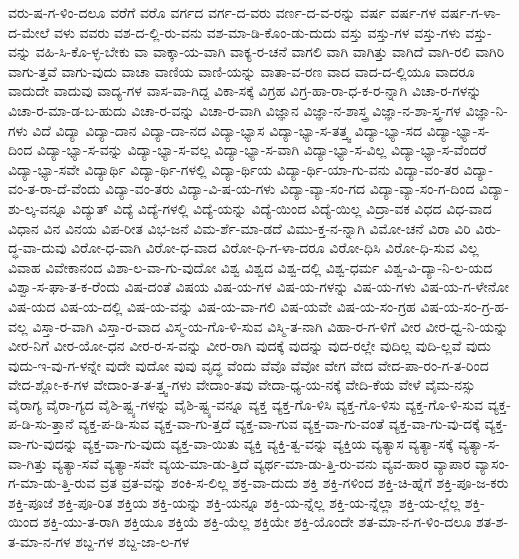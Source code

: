 {ವರು-ಷ-ಗ-ಳಿಂ-ದಲೂ
ವರೆಗೆ
ವರೊ
ವರ್ಗದ
ವರ್ಗ-ದ-ವರು
ವರ್ಣ-ದ-ವ-ರನ್ನು
ವರ್ಷ
ವರ್ಷ-ಗಳ
ವರ್ಷ-ಗ-ಳಾ-ದ-ಮೇಲೆ
ವಳು
ವವರು
ವಶ-ದ-ಲ್ಲಿ-ರು-ವನು
ವಶ-ಮಾ-ಡಿ-ಕೊಂ-ಡು-ದುದು
ವಸ್ತು
ವಸ್ತು-ಗಳ
ವಸ್ತು-ಗಳು
ವಸ್ತು-ವನ್ನು
ವಹಿ-ಸಿ-ಕೊ-ಳ್ಳ-ಬೇಕು
ವಾ
ವಾಕ್ಕಾ-ಯ-ವಾಗಿ
ವಾಕ್ಯ-ರ-ಚನೆ
ವಾಗಲಿ
ವಾಗಿ
ವಾಗಿತ್ತು
ವಾಗಿದೆ
ವಾಗಿ-ರಲಿ
ವಾಗಿರಿ
ವಾಗು-ತ್ತವೆ
ವಾಗು-ವುದು
ವಾಚಾ
ವಾಣಿಯ
ವಾಣಿ-ಯನ್ನು
ವಾತಾ-ವ-ರಣ
ವಾದ
ವಾದ-ದ-ಲ್ಲಿಯೂ
ವಾದರೂ
ವಾದುದೇ
ವಾದುವು
ವಾದ್ಯ-ಗಳ
ವಾಸ-ವಾ-ಗಿದ್ದ
ವಿಕಾ-ಸಕ್ಕೆ
ವಿಗ್ರಹ
ವಿಗ್ರ-ಹಾ-ರಾ-ಧ-ಕ-ರ-ನ್ನಾಗಿ
ವಿಚಾ-ರ-ಗಳನ್ನು
ವಿಚಾ-ರ-ಮಾ-ಡ-ಬ-ಹುದು
ವಿಚಾ-ರ-ವನ್ನು
ವಿಚಾ-ರ-ವಾಗಿ
ವಿಜ್ಞಾನ
ವಿಜ್ಞಾ-ನ-ಶಾಸ್ತ್ರ
ವಿಜ್ಞಾ-ನ-ಶಾ-ಸ್ತ್ರ-ಗಳ
ವಿಜ್ಞಾ-ನಿ-ಗಳು
ವಿದೆ
ವಿದ್ಯಾ
ವಿದ್ಯಾ-ದಾನ
ವಿದ್ಯಾ-ದಾ-ನದ
ವಿದ್ಯಾ-ಭ್ಯಾಸ
ವಿದ್ಯಾ-ಭ್ಯಾ-ಸ-ತತ್ತ್ವ
ವಿದ್ಯಾ-ಭ್ಯಾ-ಸದ
ವಿದ್ಯಾ-ಭ್ಯಾ-ಸ-ದಿಂದ
ವಿದ್ಯಾ-ಭ್ಯಾ-ಸ-ವನ್ನು
ವಿದ್ಯಾ-ಭ್ಯಾ-ಸ-ವಲ್ಲ
ವಿದ್ಯಾ-ಭ್ಯಾ-ಸ-ವಾಗಿ
ವಿದ್ಯಾ-ಭ್ಯಾ-ಸ-ವಿಲ್ಲ
ವಿದ್ಯಾ-ಭ್ಯಾ-ಸ-ವೆಂದರೆ
ವಿದ್ಯಾ-ಭ್ಯಾ-ಸವೇ
ವಿದ್ಯಾರ್ಥಿ
ವಿದ್ಯಾ-ರ್ಥಿ-ಗಳಲ್ಲಿ
ವಿದ್ಯಾ-ರ್ಥಿಯ
ವಿದ್ಯಾ-ರ್ಥಿ-ಯಾ-ಗು-ವನು
ವಿದ್ಯಾ-ವಂ-ತರ
ವಿದ್ಯಾ-ವಂ-ತ-ರಾ-ದೆ-ವೆಂದು
ವಿದ್ಯಾ-ವಂ-ತರು
ವಿದ್ಯಾ-ವಿ-ಷ-ಯ-ಗಳು
ವಿದ್ಯಾ-ವ್ಯಾ-ಸಂ-ಗದ
ವಿದ್ಯಾ-ವ್ಯಾ-ಸಂ-ಗ-ದಿಂದ
ವಿದ್ಯಾ-ಶು-ಲ್ಕ-ವನ್ನೂ
ವಿದ್ಯುತ್
ವಿದ್ಯೆ
ವಿದ್ಯೆ-ಗಳಲ್ಲಿ
ವಿದ್ಯೆ-ಯನ್ನು
ವಿದ್ಯೆ-ಯಿಂದ
ವಿದ್ಯೆ-ಯಿಲ್ಲ
ವಿದ್ರಾ-ವಕ
ವಿಧದ
ವಿಧ-ವಾದ
ವಿಧಾನ
ವಿನ
ವಿನಯ
ವಿಪ-ರೀತ
ವಿಭ-ಜನೆ
ವಿಮ-ರ್ಶೆ-ಮಾ-ಡದೆ
ವಿಮು-ಕ್ತ-ನ-ನ್ನಾಗಿ
ವಿಮೋ-ಚನೆ
ವಿರಾ
ವಿರಿ
ವಿರು-ದ್ಧ-ವಾ-ದುವು
ವಿರೋ-ಧ-ವಾಗಿ
ವಿರೋ-ಧ-ವಾದ
ವಿರೋ-ಧಿ-ಗ-ಳಾ-ದರೂ
ವಿರೋ-ಧಿಸಿ
ವಿರೋ-ಧಿ-ಸುವ
ವಿಲ್ಲ
ವಿವಾಹ
ವಿವೇಕಾನಂದ
ವಿಶಾ-ಲ-ವಾ-ಗು-ವುದೋ
ವಿಶ್ವ
ವಿಶ್ವದ
ವಿಶ್ವ-ದಲ್ಲಿ
ವಿಶ್ವ-ಧರ್ಮ
ವಿಶ್ವ-ವಿ-ದ್ಯಾ-ನಿ-ಲ-ಯದ
ವಿಶ್ವಾ-ಸ-ಘಾ-ತ-ಕ-ರೆಂದು
ವಿಷ-ದಂತೆ
ವಿಷಯ
ವಿಷ-ಯ-ಗಳ
ವಿಷ-ಯ-ಗಳನ್ನು
ವಿಷ-ಯ-ಗಳು
ವಿಷ-ಯ-ಗ-ಳೇನೋ
ವಿಷ-ಯದ
ವಿಷ-ಯ-ದಲ್ಲಿ
ವಿಷ-ಯ-ವನ್ನು
ವಿಷ-ಯ-ವಾ-ಗಲಿ
ವಿಷ-ಯವೇ
ವಿಷ-ಯ-ಸಂ-ಗ್ರಹ
ವಿಷ-ಯ-ಸಂ-ಗ್ರ-ಹ-ವಲ್ಲ
ವಿಸ್ತಾ-ರ-ವಾಗಿ
ವಿಸ್ತಾ-ರ-ವಾದ
ವಿಸ್ಮ-ಯ-ಗೊ-ಳಿ-ಸುವ
ವಿಸ್ಮಿ-ತ-ನಾಗಿ
ವಿಹಾ-ರ-ಗ-ಳಿಗೆ
ವೀರ
ವೀರ-ಧ್ವ-ನಿ-ಯನ್ನು
ವೀರ-ನಿಗೆ
ವೀರ-ಯೋ-ಧನ
ವೀರ-ರ-ಸ-ವನ್ನು
ವೀರ-ರಾಗಿ
ವುದಕ್ಕೆ
ವುದನ್ನು
ವುದ-ರಲ್ಲೇ
ವುದಿಲ್ಲ
ವುದಿ-ಲ್ಲವೆ
ವುದು
ವುದು-ಇ-ವು-ಗ-ಳನ್ನೇ
ವುದೇ
ವುದೋ
ವುವು
ವೃದ್ಧ
ವೆಂದು
ವೆವೊ
ವೆವೋ
ವೇಗ
ವೇದ
ವೇದ-ಪಾ-ರಂ-ಗ-ತ-ರಿಂದ
ವೇದ-ಶ್ಲೋ-ಕ-ಗಳ
ವೇದಾಂ-ತ-ತ-ತ್ತ್ವ-ಗಳು
ವೇದಾಂ-ತವು
ವೇದಾ-ಧ್ಯ-ಯ-ನಕ್ಕೆ
ವೇದಿ-ಕೆಯ
ವೇಳೆ
ವೈಮ-ನಸ್ಸು
ವೈರಾಗ್ಯ
ವೈರಾ-ಗ್ಯದ
ವೈಶಿ-ಷ್ಟ್ಯ-ಗಳನ್ನು
ವೈಶಿ-ಷ್ಟ್ಯ-ವನ್ನೂ
ವ್ಯಕ್ತ
ವ್ಯಕ್ತ-ಗೊ-ಳಿಸಿ
ವ್ಯಕ್ತ-ಗೊ-ಳಿಸು
ವ್ಯಕ್ತ-ಗೊ-ಳಿ-ಸುವ
ವ್ಯಕ್ತ-ಪ-ಡಿ-ಸು-ತ್ತಾನೆ
ವ್ಯಕ್ತ-ಪ-ಡಿ-ಸುವ
ವ್ಯಕ್ತ-ವಾ-ಗು-ತ್ತದೆ
ವ್ಯಕ್ತ-ವಾ-ಗುವ
ವ್ಯಕ್ತ-ವಾ-ಗು-ವಂತೆ
ವ್ಯಕ್ತ-ವಾ-ಗು-ವು-ದಕ್ಕೆ
ವ್ಯಕ್ತ-ವಾ-ಗು-ವುದನ್ನು
ವ್ಯಕ್ತ-ವಾ-ಗು-ವುದು
ವ್ಯಕ್ತ-ವಾ-ಯಿತು
ವ್ಯಕ್ತಿ
ವ್ಯಕ್ತಿ-ತ್ವ-ವನ್ನು
ವ್ಯಕ್ತಿಯ
ವ್ಯತ್ಯಾಸ
ವ್ಯತ್ಯಾ-ಸಕ್ಕೆ
ವ್ಯತ್ಯಾ-ಸ-ವಾ-ಗಿತ್ತು
ವ್ಯತ್ಯಾ-ಸವೆ
ವ್ಯತ್ಯಾ-ಸವೇ
ವ್ಯಯ-ಮಾ-ಡು-ತ್ತಿದೆ
ವ್ಯರ್ಥ-ಮಾ-ಡು-ತ್ತಿ-ರು-ವನು
ವ್ಯವ-ಹಾರ
ವ್ಯಾಪಾರ
ವ್ಯಾಸಂ-ಗ-ಮಾ-ಡು-ತ್ತಿ-ರುವ
ವ್ರತ
ವ್ರತ-ವನ್ನು
ಶಂಕಿ-ಸ-ಲಿಲ್ಲ
ಶಕ್ತ-ವಾ-ದುದು
ಶಕ್ತಿ
ಶಕ್ತಿ-ಗಳಿಂದ
ಶಕ್ತಿ-ಚಿ-ಹ್ನೆಗೆ
ಶಕ್ತಿ-ಪೂ-ಜ-ಕರು
ಶಕ್ತಿ-ಪೂಜೆ
ಶಕ್ತಿ-ಪೂ-ರಿತ
ಶಕ್ತಿಯ
ಶಕ್ತಿ-ಯನ್ನು
ಶಕ್ತಿ-ಯನ್ನೂ
ಶಕ್ತಿ-ಯ-ನ್ನೆಲ್ಲ
ಶಕ್ತಿ-ಯ-ನ್ನೆಲ್ಲಾ
ಶಕ್ತಿ-ಯ-ಲ್ಲೆಲ್ಲ
ಶಕ್ತಿ-ಯಿಂದ
ಶಕ್ತಿ-ಯು-ತ-ರಾಗಿ
ಶಕ್ತಿಯೂ
ಶಕ್ತಿಯೆ
ಶಕ್ತಿ-ಯೆಲ್ಲ
ಶಕ್ತಿಯೇ
ಶಕ್ತಿ-ಯೊಂದೇ
ಶತ-ಮಾ-ನ-ಗ-ಳಿಂ-ದಲೂ
ಶತ-ಶ-ತ-ಮಾ-ನ-ಗಳ
ಶಬ್ದ-ಗಳ
ಶಬ್ದ-ಜಾ-ಲ-ಗಳ
}

